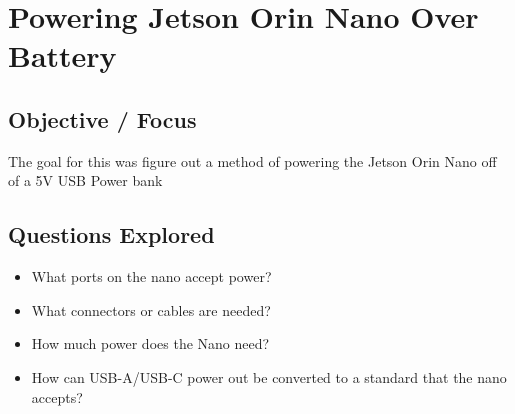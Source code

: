 \section*{Powering Jetson Orin Nano Over Battery}

\subsection*{Objective / Focus}
The goal for this was figure out a method of powering the Jetson Orin Nano off of a 5V USB Power bank

\subsection*{Questions Explored}
\begin{itemize}
    \item What ports on the nano accept power?
    \item What connectors or cables are needed?
    \item How much power does the Nano need?
    \item How can USB-A/USB-C power out be converted to a standard that the nano accepts?
\end{itemize}

